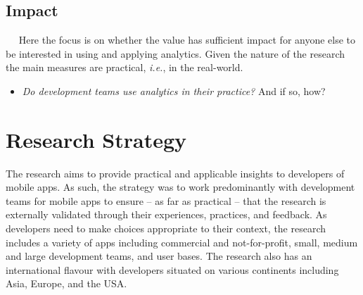 \subsection{Impact}~\label{section-impact}~\label{sec:impact}
Here the focus is on whether the value has sufficient impact for anyone else to be interested in using and applying analytics. Given the nature of the research the main measures are practical, \emph{i.e.}, in the real-world.
\begin{itemize}
    \item \emph{Do development teams use analytics in their practice?}  And if so, how? %
\end{itemize}


\section{Research Strategy}
The research aims to provide practical and applicable insights to developers of mobile apps. As such, the strategy was to work predominantly with development teams for mobile apps to ensure -- as far as practical -- that the research is externally validated through their experiences, practices, and feedback. As developers need to make choices appropriate to their context, the research includes a variety of apps including commercial and not-for-profit, small, medium and large development teams, and user bases. The research also has an international flavour with developers situated on various continents including Asia, Europe, and the USA.

